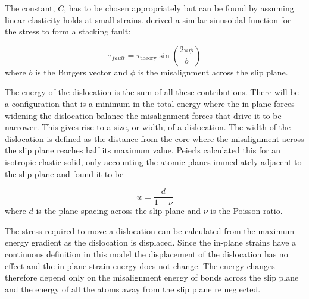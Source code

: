

%
%
%
%
%
%
%
%
%
%





The constant, $C$, has to be chosen appropriately but can be found by assuming linear elasticity holds at small strains. \citet{Frenkel1926} derived a similar sinusoidal function for the stress to form a stacking fault:










\begin{equation}
\tau_{fault} = \tau_{\text{theory}} \sin \left( \frac{2\pi \phi}{b} \right)
\end{equation}
where $b$ is the Burgers vector and $\phi$ is the misalignment across the slip plane.

The energy of the dislocation is the sum of all these contributions. There will be a configuration that is a minimum in the total energy where the in-plane forces widening the dislocation balance the misalignment forces that drive it to be narrower. This gives rise to a size, or width, of a dislocation. The width of the dislocation is defined as the distance from the core where the misalignment across the slip plane reaches half its maximum value. Peierls calculated this for an isotropic elastic solid, only accounting the atomic planes immediately adjacent to the slip plane and found it to be 

\begin{equation}
w = \frac{d}{1-\nu}
\label{eqn:width_isotropic}
\end{equation}
where $d$ is the plane spacing across the slip plane and $\nu$ is the Poisson ratio.

The stress required to move a dislocation can be calculated from the maximum energy gradient as the dislocation is displaced. Since the in-plane strains have a continuous definition in this model the displacement of the dislocation has no effect and the in-plane strain energy does not change. The energy changes therefore depend only on the misalignment energy of bonds across the slip plane and the energy of all the atoms away from the slip plane re neglected.

